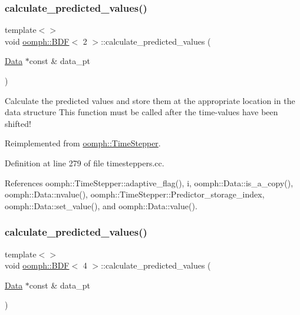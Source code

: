 \subsubsection{\texorpdfstring{calculate\+\_\+predicted\+\_\+values()}{calculate\_predicted\_values()}\hspace{0.1cm}{\footnotesize\ttfamily [2/4]}}
{\footnotesize\ttfamily template$<$$>$ \\
void \hyperlink{classoomph_1_1BDF}{oomph\+::\+B\+DF}$<$ 2 $>$\+::calculate\+\_\+predicted\+\_\+values (\begin{DoxyParamCaption}\item[{\hyperlink{classoomph_1_1Data}{Data} $\ast$const \&}]{data\+\_\+pt }\end{DoxyParamCaption})\hspace{0.3cm}{\ttfamily [virtual]}}

Calculate the predicted values and store them at the appropriate location in the data structure This function must be called after the time-\/values have been shifted! 

Reimplemented from \hyperlink{classoomph_1_1TimeStepper_a159d508b1ae643fe31b55da9ee789dbf}{oomph\+::\+Time\+Stepper}.



Definition at line 279 of file timesteppers.\+cc.



References oomph\+::\+Time\+Stepper\+::adaptive\+\_\+flag(), i, oomph\+::\+Data\+::is\+\_\+a\+\_\+copy(), oomph\+::\+Data\+::nvalue(), oomph\+::\+Time\+Stepper\+::\+Predictor\+\_\+storage\+\_\+index, oomph\+::\+Data\+::set\+\_\+value(), and oomph\+::\+Data\+::value().

\mbox{\label{classoomph_1_1BDF_abdf120f326bbd903a94e2fd8d17530b2}} 
\subsubsection{\texorpdfstring{calculate\+\_\+predicted\+\_\+values()}{calculate\_predicted\_values()}\hspace{0.1cm}{\footnotesize\ttfamily [3/4]}}
{\footnotesize\ttfamily template$<$$>$ \\
void \hyperlink{classoomph_1_1BDF}{oomph\+::\+B\+DF}$<$ 4 $>$\+::calculate\+\_\+predicted\+\_\+values (\begin{DoxyParamCaption}\item[{\hyperlink{classoomph_1_1Data}{Data} $\ast$const \&}]{data\+\_\+pt }\end{DoxyParamCaption})\hspace{0.3cm}{\ttfamily [virtual]}}

